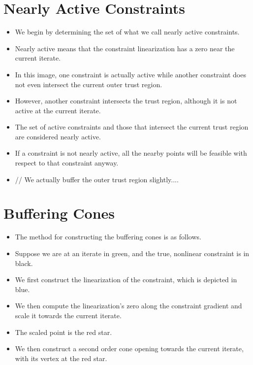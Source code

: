\documentclass{article}
\begin{document}
	\section{Nearly Active Constraints}
\begin{itemize}
\item We begin by determining the set of what we call nearly active constraints.
\item Nearly active means that the constraint linearization has a zero near the current iterate.
\item In this image, one constraint is actually active while another constraint does not even intersect the current outer trust region.
\item However, another constraint intersects the trust region, although it is not active at the current iterate.
\item The set of active constraints and those that intersect the current trust region are considered nearly active.
\item If a constraint is not nearly active, all the nearby points will be feasible with respect to that constraint anyway.
\item // We actually buffer the outer trust region slightly....
\end{itemize}

	\section{Buffering Cones}
\begin{itemize}
\item The method for constructing the buffering cones is as follows.
\item Suppose we are at an iterate in green, and the true, nonlinear constraint is in black.
\item We first construct the linearization of the constraint, which is depicted in blue.
\end{itemize}

\hrulefill

\begin{itemize}
\item We then compute the linearization's zero along the constraint gradient and scale it towards the current iterate.
\item The scaled point is the red star.
\item We then construct a second order cone opening towards the current iterate, with its vertex at the red star.
\end{itemize}
\end{document}
